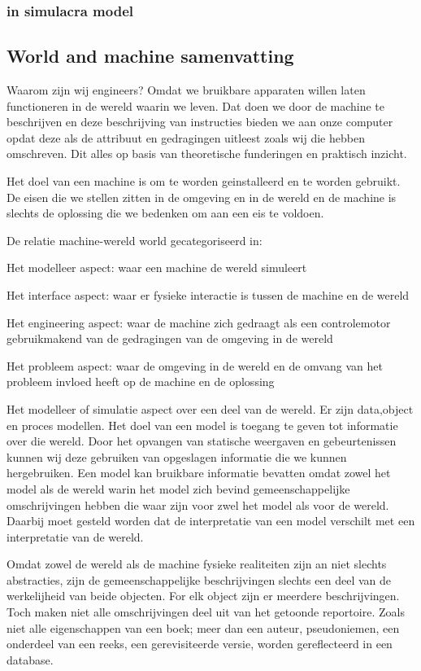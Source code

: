 \subsubsection{in simulacra model}

\subsection{World and machine samenvatting}
Waarom zijn wij engineers? Omdat we bruikbare apparaten willen laten functioneren in de wereld waarin we leven. Dat doen we door de machine te beschrijven en deze beschrijving van instructies bieden we aan onze computer opdat deze als de attribuut en gedragingen uitleest zoals wij die hebben omschreven. Dit alles op basis van theoretische funderingen en praktisch inzicht. 

Het doel van een machine is om te worden geinstalleerd en te worden gebruikt. De eisen die we stellen zitten in de omgeving en in de wereld en de machine is slechts de oplossing die we bedenken om aan een eis te voldoen. 

De relatie machine-wereld world gecategoriseerd in: 

Het modelleer aspect: waar een machine de wereld simuleert 

Het interface aspect: waar er fysieke interactie is tussen de machine en de wereld 

Het engineering aspect: waar de machine zich gedraagt als een controlemotor gebruikmakend van de gedragingen van de omgeving in de wereld 

Het probleem aspect: waar de omgeving in de wereld en de omvang van het probleem invloed heeft op de machine en de oplossing 

Het modelleer  of simulatie aspect over een deel van de wereld. Er zijn data,object en proces modellen. Het doel van een model is toegang te geven tot informatie over die wereld. Door het opvangen van statische weergaven en gebeurtenissen kunnen wij deze gebruiken van opgeslagen informatie die we kunnen hergebruiken. Een model kan bruikbare informatie bevatten omdat zowel het model als de wereld warin het model zich bevind gemeenschappelijke omschrijvingen hebben die waar zijn voor zwel het model als voor de wereld. Daarbij moet gesteld worden dat de interpretatie van een model verschilt met een interpretatie van de wereld. 

Omdat zowel de wereld als de machine fysieke realiteiten zijn an niet slechts abstracties, zijn de gemeenschappelijke beschrijvingen slechts een deel van de werkelijheid van beide objecten. For elk object zijn er meerdere beschrijvingen. Toch maken niet alle omschrijvingen deel uit van het getoonde reportoire. Zoals niet alle eigenschappen van een boek; meer dan een auteur, pseudoniemen, een onderdeel van een reeks, een gerevisiteerde versie, worden gereflecteerd in een database.  

